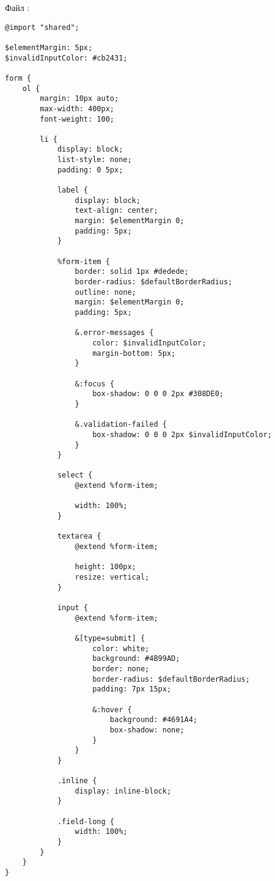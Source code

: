 \documentclass[a4paper,14pt]{extarticle}
\begin{document}
Файл :
\begin{lstlisting}
@import "shared";

$elementMargin: 5px;
$invalidInputColor: #cb2431;

form {
    ol {
        margin: 10px auto;
        max-width: 400px;
        font-weight: 100;

        li {
            display: block;
            list-style: none;
            padding: 0 5px;

            label {
                display: block;
                text-align: center;
                margin: $elementMargin 0;
                padding: 5px;
            }

            %form-item {
                border: solid 1px #dedede;
                border-radius: $defaultBorderRadius;
                outline: none;
                margin: $elementMargin 0;
                padding: 5px;

                &.error-messages {
                    color: $invalidInputColor;
                    margin-bottom: 5px;
                }

                &:focus {
                    box-shadow: 0 0 0 2px #308DE0;
                }

                &.validation-failed {
                    box-shadow: 0 0 0 2px $invalidInputColor;
                }
            }

            select {
                @extend %form-item;

                width: 100%;
            }

            textarea {
                @extend %form-item;

                height: 100px;
                resize: vertical;
            }

            input {
                @extend %form-item;

                &[type=submit] {
                    color: white;
                    background: #4B99AD;
                    border: none;
                    border-radius: $defaultBorderRadius;
                    padding: 7px 15px;

                    &:hover {
                        background: #4691A4;
                        box-shadow: none;
                    }
                }
            }

            .inline {
                display: inline-block;
            }

            .field-long {
                width: 100%;
            }
        }
    }
}
\end{lstlisting}
\end{document}
